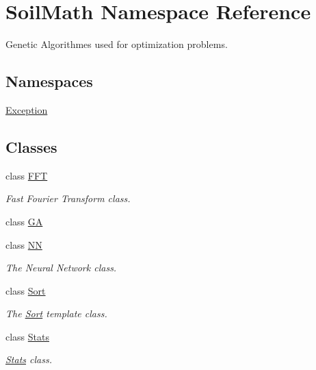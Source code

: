 \hypertarget{namespace_soil_math}{}\section{Soil\+Math Namespace Reference}
\label{namespace_soil_math}


Genetic Algorithmes used for optimization problems.  


\subsection*{Namespaces}
\begin{DoxyCompactItemize}
\item 
 \hyperlink{namespace_soil_math_1_1_exception}{Exception}
\end{DoxyCompactItemize}
\subsection*{Classes}
\begin{DoxyCompactItemize}
\item 
class \hyperlink{class_soil_math_1_1_f_f_t}{F\+F\+T}
\begin{DoxyCompactList}\small\item\em Fast Fourier Transform class. \end{DoxyCompactList}\item 
class \hyperlink{class_soil_math_1_1_g_a}{G\+A}
\item 
class \hyperlink{class_soil_math_1_1_n_n}{N\+N}
\begin{DoxyCompactList}\small\item\em The Neural Network class. \end{DoxyCompactList}\item 
class \hyperlink{class_soil_math_1_1_sort}{Sort}
\begin{DoxyCompactList}\small\item\em The \hyperlink{class_soil_math_1_1_sort}{Sort} template class. \end{DoxyCompactList}\item 
class \hyperlink{class_soil_math_1_1_stats}{Stats}
\begin{DoxyCompactList}\small\item\em \hyperlink{class_soil_math_1_1_stats}{Stats} class. \end{DoxyCompactList}\end{DoxyCompactItemize}
